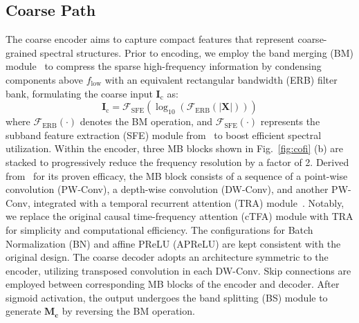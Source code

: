 \documentclass[journal]{IEEEtran}
\begin{document}
\subsection{Coarse Path}
\label{coarse}
The coarse encoder aims to capture compact features that represent coarse-grained spectral structures.
Prior to encoding, we employ the band merging (BM) module~\cite{gtcrn} to compress the sparse high-frequency information by condensing components above $f_{\text{low}}$ with an equivalent rectangular bandwidth (ERB) filter bank, formulating the coarse input $\mathbf{I}_{\text{c}}$ as:
\begin{equation}
\mathbf{I}_{\text{c}} = \mathcal{F}_{\text{SFE}} \left( \log_{10} \left( \mathcal{F}_{\text{ERB}} \left( |\mathbf{X}| \right) \right) \right)
\label{eq:coarse_input}
\end{equation}
\noindent where $\mathcal{F}_{\text{ERB}}(\cdot)$ denotes the BM operation, and $\mathcal{F}_{\text{SFE}}(\cdot)$ represents the subband feature extraction (SFE) module from~\cite{gtcrn} to boost efficient spectral utilization.
Within the encoder, three MB blocks shown in Fig.~\ref{fig:cofi} (b) are stacked to progressively reduce the frequency resolution by a factor of 2. 
Derived from~\cite{ulunas} for its proven efficacy, the MB block consists of a sequence of a point-wise convolution (PW-Conv), a depth-wise convolution (DW-Conv), and another PW-Conv, integrated with a temporal recurrent attention (TRA) module~\cite{gtcrn}. 
Notably, we replace the original causal time-frequency attention (cTFA) module with TRA for simplicity and computational efficiency. 
The configurations for Batch Normalization (BN) and affine PReLU (APReLU) are kept consistent with the original design.
The coarse decoder adopts an architecture symmetric to the encoder, utilizing transposed convolution in each DW-Conv.
Skip connections are employed between corresponding MB blocks of the encoder and decoder.
After sigmoid activation, the output undergoes the band splitting (BS) module to generate $\mathbf{M_c}$ by reversing the BM operation.
\end{document}
